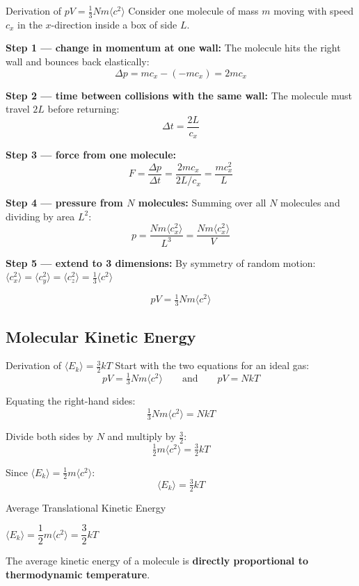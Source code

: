 \begin{examplebox}{Derivation of \texorpdfstring{$pV = \frac{1}{3}Nm\langle c^2\rangle$}{pV = (1/3)Nm<c^2>}}
Consider one molecule of mass $m$ moving with speed $c_x$ in the $x$-direction inside a box of side $L$.

\textbf{Step 1 — change in momentum at one wall:}
The molecule hits the right wall and bounces back elastically:
$$\Delta p = mc_x - (-mc_x) = 2mc_x$$

\textbf{Step 2 — time between collisions with the same wall:}
The molecule must travel $2L$ before returning:
$$\Delta t = \frac{2L}{c_x}$$

\textbf{Step 3 — force from one molecule:}
$$F = \frac{\Delta p}{\Delta t} = \frac{2mc_x}{2L/c_x} = \frac{mc_x^2}{L}$$

\textbf{Step 4 — pressure from $N$ molecules:}
Summing over all $N$ molecules and dividing by area $L^2$:
$$p = \frac{Nm\langle c_x^2\rangle}{L^3} = \frac{Nm\langle c_x^2\rangle}{V}$$

\textbf{Step 5 — extend to 3 dimensions:}
By symmetry of random motion: $\langle c_x^2\rangle = \langle c_y^2\rangle = \langle c_z^2\rangle = \tfrac{1}{3}\langle c^2\rangle$

$$\boxed{pV = \tfrac{1}{3}Nm\langle c^2\rangle}$$
\end{examplebox}

\subsection{Molecular Kinetic Energy}

\begin{examplebox}{Derivation of \texorpdfstring{$\langle E_k\rangle = \frac{3}{2}kT$}{<Ek> = (3/2)kT}}
Start with the two equations for an ideal gas:
$$pV = \tfrac{1}{3}Nm\langle c^2\rangle \qquad \text{and} \qquad pV = NkT$$

Equating the right-hand sides:
$$\tfrac{1}{3}Nm\langle c^2\rangle = NkT$$

Divide both sides by $N$ and multiply by $\tfrac{3}{2}$:
$$\tfrac{1}{2}m\langle c^2\rangle = \tfrac{3}{2}kT$$

Since $\langle E_k\rangle = \tfrac{1}{2}m\langle c^2\rangle$:
$$\boxed{\langle E_k\rangle = \tfrac{3}{2}kT}$$
\end{examplebox}

\begin{formulabox}{Average Translational Kinetic Energy}
\begin{center}
\Large $\langle E_k \rangle = \dfrac{1}{2}m\langle c^2 \rangle = \dfrac{3}{2}kT$
\end{center}
The average kinetic energy of a molecule is \textbf{directly proportional to thermodynamic temperature}.
\end{formulabox}

